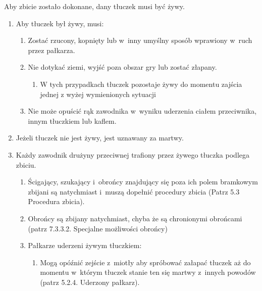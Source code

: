 \documentclass[12pt,a4paper]{article}
\begin{document}
Aby zbicie zostało dokonane, dany tłuczek musi być żywy.

\begin{enumerate}
	\item
	      Aby tłuczek był żywy, musi:

	      \begin{enumerate}
		      \item
		            Zostać rzucony, kopnięty lub w~inny umyślny sposób wprawiony w~ruch przez pałkarza.
		      \item
		            Nie dotykać ziemi, wyjść poza obszar gry lub zostać złapany.

		            \begin{enumerate}
			            \item
			                  W tych przypadkach tłuczek pozostaje żywy do momentu zajścia jednej z wyżej
			                  wymienionych sytuacji
		            \end{enumerate}
		      \item
		            Nie może opuścić rąk zawodnika w~wyniku uderzenia ciałem
		            przeciwnika, innym tłuczkiem lub kaflem.
	      \end{enumerate}
	\item
	      Jeżeli tłuczek nie jest żywy, jest uznawany za martwy.
	\item
	      Każdy zawodnik drużyny przeciwnej trafiony przez żywego tłuczka
	      podlega zbiciu.

	      \begin{enumerate}
		      \item
		            Ścigający, szukający i~obrońcy znajdujący się poza ich polem
		            bramkowym zbijani są natychmiast i~muszą dopełnić procedury zbicia
		            (Patrz 5.3 Procedura zbicia).
		      \item
		            Obrońcy są zbijany natychmiast, chyba że są chronionymi obrońcami
		            (patrz 7.3.3.2. Specjalne możliwości obrońcy)
		      \item
		            Pałkarze uderzeni żywym tłuczkiem:

		            \begin{enumerate}
			            \item
			                  Mogą opóźnić zejście z~miotły aby spróbować załapać tłuczek aż do
			                  momentu w~którym tłuczek stanie ten się martwy z~innych powodów
			                  (patrz 5.2.4. Uderzony pałkarz).


\end{enumerate}
\end{enumerate}
\end{enumerate}
\end{document}
